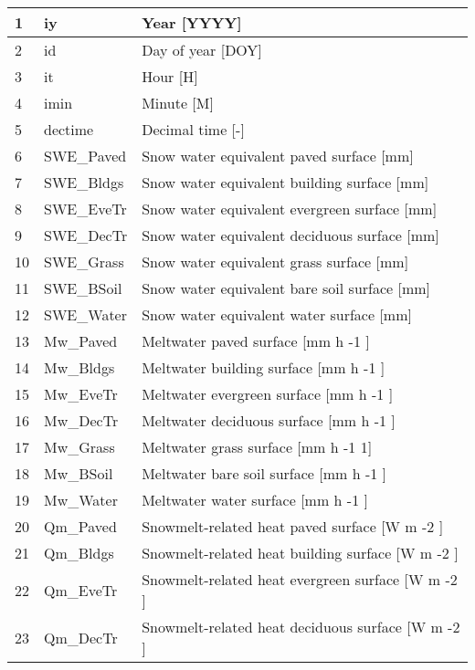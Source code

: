 \documentclass[letterpaper,10pt,english]{sphinxmanual}
\begin{document}
\begin{savenotes}
\begin{longtable}{|l|l|l|}
1
&
iy
&
Year {[}YYYY{]}
\\
\hline
2
&
id
&
Day of year {[}DOY{]}
\\
\hline
3
&
it
&
Hour {[}H{]}
\\
\hline
4
&
imin
&
Minute {[}M{]}
\\
\hline
5
&
dectime
&
Decimal time {[}-{]}
\\
\hline
6
&
SWE\_Paved
&
Snow water equivalent \textendash{} paved surface {[}mm{]}
\\
\hline
7
&
SWE\_Bldgs
&
Snow water equivalent \textendash{} building surface {[}mm{]}
\\
\hline
8
&
SWE\_EveTr
&
Snow water equivalent \textendash{} evergreen surface {[}mm{]}
\\
\hline
9
&
SWE\_DecTr
&
Snow water equivalent \textendash{} deciduous surface {[}mm{]}
\\
\hline
10
&
SWE\_Grass
&
Snow water equivalent \textendash{} grass surface {[}mm{]}
\\
\hline
11
&
SWE\_BSoil
&
Snow water equivalent \textendash{} bare soil surface {[}mm{]}
\\
\hline
12
&
SWE\_Water
&
Snow water equivalent \textendash{} water surface {[}mm{]}
\\
\hline
13
&
Mw\_Paved
&
Meltwater \textendash{} paved surface {[}mm h -1 {]}
\\
\hline
14
&
Mw\_Bldgs
&
Meltwater \textendash{} building surface {[}mm h -1 {]}
\\
\hline
15
&
Mw\_EveTr
&
Meltwater \textendash{} evergreen surface {[}mm h -1 {]}
\\
\hline
16
&
Mw\_DecTr
&
Meltwater \textendash{} deciduous surface {[}mm h -1 {]}
\\
\hline
17
&
Mw\_Grass
&
Meltwater \textendash{} grass surface {[}mm h -1 1{]}
\\
\hline
18
&
Mw\_BSoil
&
Meltwater \textendash{} bare soil surface {[}mm h -1 {]}
\\
\hline
19
&
Mw\_Water
&
Meltwater \textendash{} water surface {[}mm h -1 {]}
\\
\hline
20
&
Qm\_Paved
&
Snowmelt-related heat \textendash{} paved surface {[}W m -2 {]}
\\
\hline
21
&
Qm\_Bldgs
&
Snowmelt-related heat \textendash{} building surface {[}W m -2 {]}
\\
\hline
22
&
Qm\_EveTr
&
Snowmelt-related heat \textendash{} evergreen surface {[}W m -2 {]}
\\
\hline
23
&
Qm\_DecTr
&
Snowmelt-related heat \textendash{} deciduous surface {[}W m -2 {]}

\end{longtable}
\end{savenotes}
\end{document}
